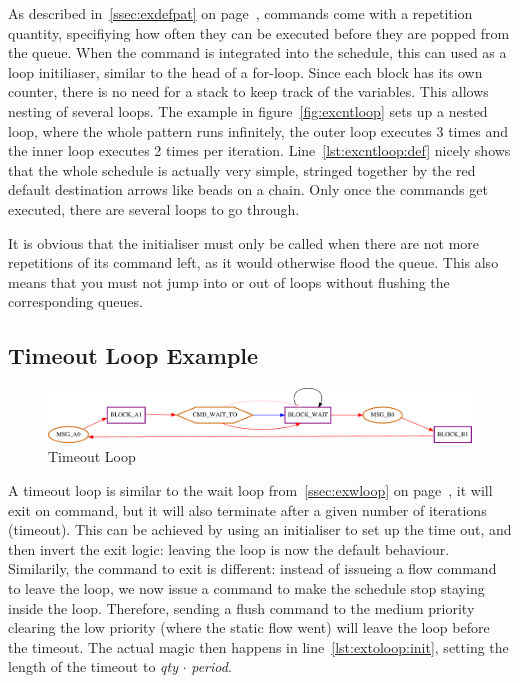 As described in~\ref{ssec:exdefpat} on page~\pageref{ssec:exdefpat}, commands come with a repetition quantity, specifiying how often they can be executed before they are popped from the queue.
When the command is integrated into the schedule, this can used as a loop initiliaser, similar to the head of a for-loop. Since each block has its own
counter, there is no need for a stack to keep track of the variables. This allows nesting of several loops. The example in figure~\ref{fig:excntloop} sets up a nested loop, where the whole pattern runs infinitely, the outer loop executes 3 times and the inner loop executes 2 times per iteration. Line~\ref{lst:excntloop:def} nicely shows that the whole schedule is actually very simple, stringed together by the red default destination arrows like beads on a chain.
Only once the commands get executed, there are several loops to go through.
\par It is obvious that the initialiser must only be called when there are not more repetitions of its command left, as it would otherwise flood the queue.
This also means that you must not jump into or out of loops without flushing the corresponding queues.
\vspace{2ex}

\subsection{Timeout Loop Example}
%
\begin{figure}[H]
   \centering
   \def\svgwidth{1.0\textwidth}
   \includegraphics*[width=1.0\textwidth,keepaspectratio]{Figures/extoloop}
   \caption{ Timeout Loop }
   \label{fig:extoloop}
\end{figure}



A timeout loop is similar to the wait loop from~\ref{ssec:exwloop} on page~\pageref{ssec:exwloop}, it will exit on command, but it will also terminate after a given number of iterations (timeout).
This can be achieved by using an initialiser to set up the time out, and then invert the exit logic: leaving the loop is now the default behaviour. Similarily, the command to exit is different: instead of issueing a flow command to leave the loop, we now issue a command to make the schedule stop staying inside the loop. Therefore, sending a flush command to the medium priority clearing the low priority (where the static flow went) will leave the loop before the timeout. The actual magic then happens in line~\ref{lst:extoloop:init}, setting the length of the timeout to \emph{qty} $\cdot$ \emph{period}.
\vspace{2ex}


